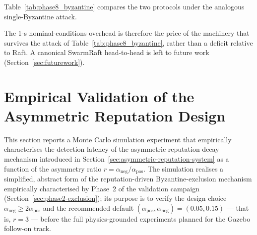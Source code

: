 \documentclass[journal,10pt,twocolumn]{IEEEtran}
\begin{document}
Table~\ref{tab:phase8_byzantine} compares the two protocols under the analogous single-Byzantine attack.

\begin{table}[t]
\centering
\caption{Phase~8 single-Byzantine adversarial comparison. Vanilla Raft trusts every heartbeat and is therefore compromised indefinitely by a Byzantine leader-claimer. The proposed system detects and excludes the analogous Byzantine anchor via Pillar~5 (spoof detection) and Pillar~3 (reputation) within the Phase~5 detection envelope.}
\label{tab:phase8_byzantine}
\small
{}
\end{table}

The 1-s nominal-conditions overhead is therefore the price of the machinery that survives the attack of Table~\ref{tab:phase8_byzantine}, rather than a deficit relative to Raft. A canonical SwarmRaft head-to-head is left to future work (Section~\ref{sec:futurework}).



\section{Empirical Validation of the Asymmetric Reputation Design}
\label{sec:asym-decay-empirical}

This section reports a Monte Carlo simulation experiment that
empirically characterises the detection latency of the asymmetric
reputation decay mechanism introduced in
Section~\ref{sec:asymmetric-reputation-system} as a function of the
asymmetry ratio $r = \alpha_\text{neg}/\alpha_\text{pos}$. The
simulation realises a simplified, abstract form of the
reputation-driven Byzantine-exclusion mechanism empirically
characterised by Phase~2 of the validation campaign
(Section~\ref{sec:phase2-exclusion}); its purpose is to verify the design choice
$\alpha_\text{neg} \geq 2\alpha_\text{pos}$ and the recommended
default $(\alpha_\text{pos}, \alpha_\text{neg}) = (0.05, 0.15)$ --- that
is, $r = 3$ --- before the full physics-grounded experiments planned for
the Gazebo follow-on track.
\end{document}

